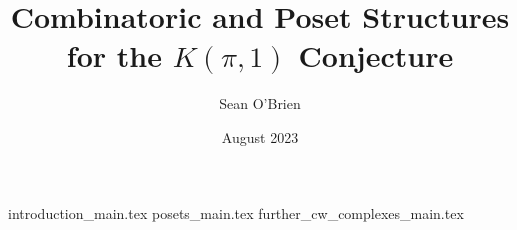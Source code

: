 \documentclass[12pt]{article}
\title{Combinatoric and Poset Structures for the $K(\pi,1)$ Conjecture}
\author{Sean O'Brien}
\date{August 2023}
\begin{document}
\maketitle
{introduction_main.tex}
{posets_main.tex}
{further_cw_complexes_main.tex}


\printbibliography
\end{document}

